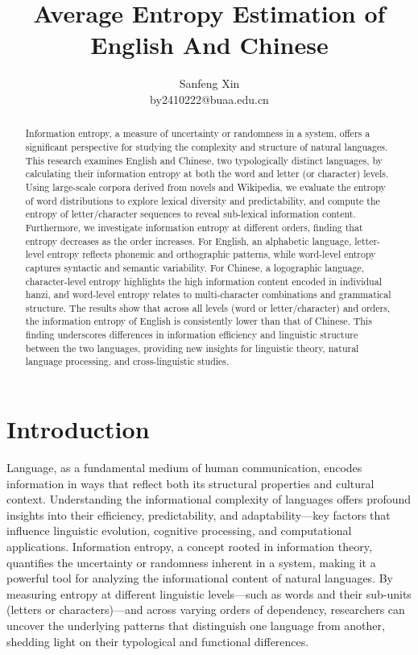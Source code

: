 \documentclass[12pt]{article}
\title{\fontsize{14}{16}\bfseries Average Entropy Estimation of English And Chinese}
\author{\small Sanfeng Xin\\ \small by2410222@buaa.edu.cn}
\date{}
\begin{document}
\maketitle
\renewcommand{\abstractname}{\textbf{\Large Abstract}} %
\begin{abstract}
    Information entropy, a measure of uncertainty or randomness in a system, offers a significant perspective for studying the complexity and structure of natural languages. This research examines English and Chinese, two typologically distinct languages, by calculating their information entropy at both the word and letter (or character) levels. Using large-scale corpora derived from novels and Wikipedia, we evaluate the entropy of word distributions to explore lexical diversity and predictability, and compute the entropy of letter/character sequences to reveal sub-lexical information content. Furthermore, we investigate information entropy at different orders, finding that entropy decreases as the order increases. For English, an alphabetic language, letter-level entropy reflects phonemic and orthographic patterns, while word-level entropy captures syntactic and semantic variability. For Chinese, a logographic language, character-level entropy highlights the high information content encoded in individual hanzi, and word-level entropy relates to multi-character combinations and grammatical structure. The results show that across all levels (word or letter/character) and orders, the information entropy of English is consistently lower than that of Chinese. This finding underscores differences in information efficiency and linguistic structure between the two languages, providing new insights for linguistic theory, natural language processing, and cross-linguistic studies.
\end{abstract}

\section*{\centering Introduction}
Language, as a fundamental medium of human communication, encodes information in ways that reflect both its structural properties and cultural context. Understanding the informational complexity of languages offers profound insights into their efficiency, predictability, and adaptability—key factors that influence linguistic evolution, cognitive processing, and computational applications. Information entropy, a concept rooted in information theory, quantifies the uncertainty or randomness inherent in a system, making it a powerful tool for analyzing the informational content of natural languages. By measuring entropy at different linguistic levels—such as words and their sub-units (letters or characters)—and across varying orders of dependency, researchers can uncover the underlying patterns that distinguish one language from another, shedding light on their typological and functional differences.
\end{document}
